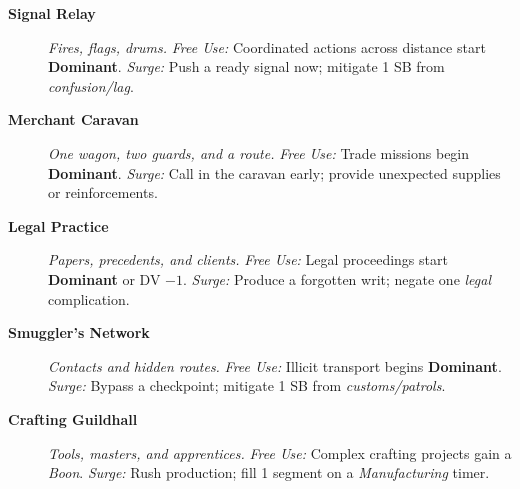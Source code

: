 \begin{description}
  \item[\textbf{Signal Relay}]  \emph{Fires, flags, drums.} \emph{Free Use:} Coordinated actions across distance start \textbf{Dominant}. \emph{Surge:} Push a ready signal now; mitigate 1 SB from \emph{confusion/lag}.

  \item[\textbf{Merchant Caravan}]  \emph{One wagon, two guards, and a route.} \emph{Free Use:} Trade missions begin \textbf{Dominant}. \emph{Surge:} Call in the caravan early; provide unexpected supplies or reinforcements.

  \item[\textbf{Legal Practice}]  \emph{Papers, precedents, and clients.} \emph{Free Use:} Legal proceedings start \textbf{Dominant} or DV $-1$. \emph{Surge:} Produce a forgotten writ; negate one \emph{legal} complication.

  \item[\textbf{Smuggler's Network}]  \emph{Contacts and hidden routes.} \emph{Free Use:} Illicit transport begins \textbf{Dominant}. \emph{Surge:} Bypass a checkpoint; mitigate 1 SB from \emph{customs/patrols}.

  \item[\textbf{Crafting Guildhall}]  \emph{Tools, masters, and apprentices.} \emph{Free Use:} Complex crafting projects gain a \emph{Boon}. \emph{Surge:} Rush production; fill 1 segment on a \emph{Manufacturing} timer.
\end{description}

